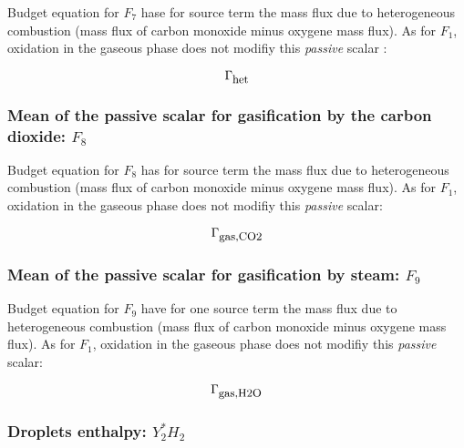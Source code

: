 Budget equation for $F_{7}$ hase for source term the mass flux due to
heterogeneous combustion (mass flux of carbon monoxide minus oxygene mass
flux). As for $F_{1}$, oxidation in the gaseous phase does not modifiy this {\em
  passive} scalar :

\begin{equation}
   \Gamma_{\mbox{\small het}}
\end{equation}   
         
 \subsubsection*{Mean of the passive scalar for gasification by the carbon dioxide: $F_{8}$}  
 
 Budget equation for $F_{8}$ has for source term the mass flux due to
 heterogeneous combustion (mass flux of carbon monoxide minus oxygene mass
 flux). As for $F_{1}$, oxidation in the gaseous phase does not modifiy this
 {\em passive} scalar:
  
\begin{equation}
   \Gamma_{\mbox{\small gas,CO2}}
\end{equation}                         

 \subsubsection*{Mean of the passive scalar for gasification by steam: $F_{9}$}  
 
 Budget equation for $F_{9}$ have for one source term the mass flux due to
 heterogeneous combustion (mass flux of carbon monoxide minus oxygene mass
 flux). As for $F_{1}$, oxidation in the gaseous phase does not modifiy this
 {\em passive} scalar:
 
\begin{equation}
   \Gamma_{\mbox{\small gas,H2O}}
\end{equation}                         

 



\subsubsection*{Droplets enthalpy: $Y_{2}^{*}H_{2}$ }
 
